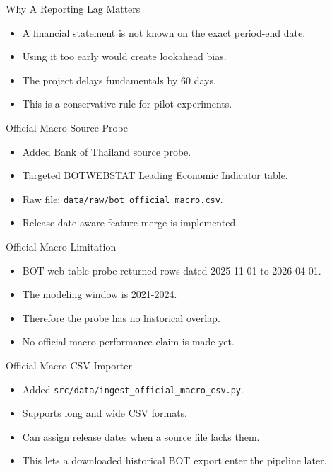 \documentclass[aspectratio=43,10pt]{beamer}
\begin{document}
\begin{frame}{Why A Reporting Lag Matters}
\begin{itemize}
  \item A financial statement is not known on the exact period-end date.
  \item Using it too early would create lookahead bias.
  \item The project delays fundamentals by 60 days.
  \item This is a conservative rule for pilot experiments.
\end{itemize}
\end{frame}

\begin{frame}{Official Macro Source Probe}
\begin{itemize}
  \item Added Bank of Thailand source probe.
  \item Targeted BOTWEBSTAT Leading Economic Indicator table.
  \item Raw file: \texttt{data/raw/bot\_official\_macro.csv}.
  \item Release-date-aware feature merge is implemented.
\end{itemize}
\end{frame}

\begin{frame}{Official Macro Limitation}
\begin{itemize}
  \item BOT web table probe returned rows dated 2025-11-01 to 2026-04-01.
  \item The modeling window is 2021-2024.
  \item Therefore the probe has no historical overlap.
  \item No official macro performance claim is made yet.
\end{itemize}
\end{frame}

\begin{frame}{Official Macro CSV Importer}
\begin{itemize}
  \item Added \texttt{src/data/ingest\_official\_macro\_csv.py}.
  \item Supports long and wide CSV formats.
  \item Can assign release dates when a source file lacks them.
  \item This lets a downloaded historical BOT export enter the pipeline later.
\end{itemize}
\end{frame}
\end{document}
